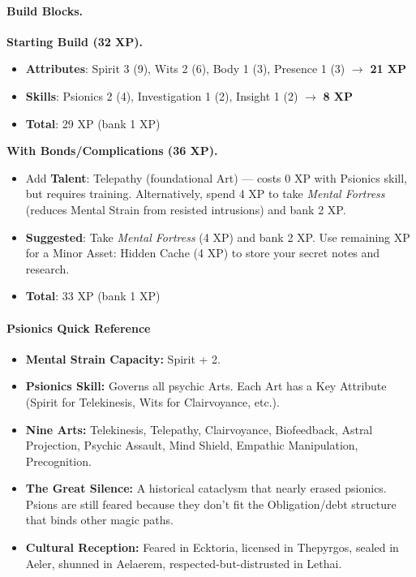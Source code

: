 \paragraph{Build Blocks.}
\textbf{Starting Build (32 XP).}
\begin{itemize}
\item \textbf{Attributes}: Spirit 3 (9), Wits 2 (6), Body 1 (3), Presence 1 (3) \(\rightarrow\) \textbf{21 XP}
\item \textbf{Skills}: Psionics 2 (4), Investigation 1 (2), Insight 1 (2) \(\rightarrow\) \textbf{8 XP}
\item \textbf{Total}: 29 XP (bank 1 XP)
\end{itemize}
\textbf{With Bonds/Complications (36 XP).}
\begin{itemize}
\item Add \textbf{Talent}: Telepathy (foundational Art) --- costs 0 XP with Psionics skill, but requires training. Alternatively, spend 4 XP to take \emph{Mental Fortress} (reduces Mental Strain from resisted intrusions) and bank 2 XP.
\item \textbf{Suggested}: Take \emph{Mental Fortress} (4 XP) and bank 2 XP. Use remaining XP for a Minor Asset: Hidden Cache (4 XP) to store your secret notes and research.
\item \textbf{Total}: 33 XP (bank 1 XP)
\end{itemize}

\paragraph{Psionics Quick Reference}
\label{sec:psionics-ref}
\begin{itemize}
\item \textbf{Mental Strain Capacity:} Spirit + 2.
\item \textbf{Psionics Skill:} Governs all psychic Arts. Each Art has a Key Attribute (Spirit for Telekinesis, Wits for Clairvoyance, etc.).
\item \textbf{Nine Arts:} Telekinesis, Telepathy, Clairvoyance, Biofeedback, Astral Projection, Psychic Assault, Mind Shield, Empathic Manipulation, Precognition.
\item \textbf{The Great Silence:} A historical cataclysm that nearly erased psionics. Psions are still feared because they don't fit the Obligation/debt structure that binds other magic paths.
\item \textbf{Cultural Reception:} Feared in Ecktoria, licensed in Thepyrgos, sealed in Aeler, shunned in Aelaerem, respected-but-distrusted in Lethai.
\end{itemize}

